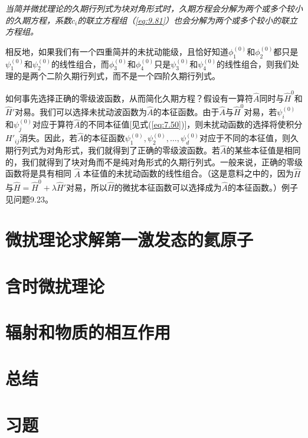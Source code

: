     \textit{ 当简并微扰理论的久期行列式为块对角形式时，久期方程会分解为两个或多个较小的久期方程，系数$c_i$的联立方程组（\ref{eq:9.81}）也会分解为两个或多个较小的联立方程组。}

    相反地，如果我们有一个四重简并的未扰动能级，且恰好知道$\phi_1^{\left(0\right)}$和$\phi_2^{\left(0\right)}$都只是$\psi_1^{\left(0\right)}$和$\psi_2^{\left(0\right)}$的线性组合，而$\phi_3^{\left(0\right)}$和$\phi_4^{\left(0\right)}$只是$\psi_3^{\left(0\right)}$和$\psi_4^{\left(0\right)}$的线性组合，则我们处理的是两个二阶久期行列式，而不是一个四阶久期行列式。

    如何事先选择正确的零级波函数，从而简化久期方程？假设有一算符$\hat{A}$同时与$\hat{H}^0$和$\hat{H}'$对易。我们可以选择未扰动波函数为$\hat{A}$的本征函数。由于$\hat{A}$与$\hat{H}^0$对易，若$\psi_i^{\left(0\right)}$和$\psi_j^{\left(0\right)}$对应于算符$\hat{A}$的不同本征值[见式(\ref{eq:7.50})]，则未扰动函数的选择将使积分$H'_{ij}$消失。因此，若$\hat{A}$的本征函数$\psi_1^{\left(0\right)}, \psi_2^{\left(0\right)}, \ldots, \psi_d^{\left(0\right)}$对应于不同的本征值，则久期行列式为对角形式，我们就得到了正确的零级波函数。若$\hat{A}$的某些本征值是相同的，我们就得到了块对角而不是纯对角形式的久期行列式。一般来说，正确的零级函数将是具有相同 $\hat{A}$ 本征值的未扰动函数的线性组合。（这是意料之中的，因为$\hat{H}$与$\hat{H} = \hat{H}^0 + \lambda\hat{H}'$对易，所以$\hat{H}$的微扰本征函数可以选择成为$\hat{A}$的本征函数。）例子见问题9.23。

\section{微扰理论求解第一激发态的氦原子}
\label{sec:9.7 Perturbation Treatment of the First Excited State of Helium}



















\section{含时微扰理论}
\label{sec:9.8 Time-dependent Perturbation Theory}

\section{辐射和物质的相互作用}
\label{sec:9.9 Interaction of Radiation and Matter}

\section*{总结}

\section*{习题}